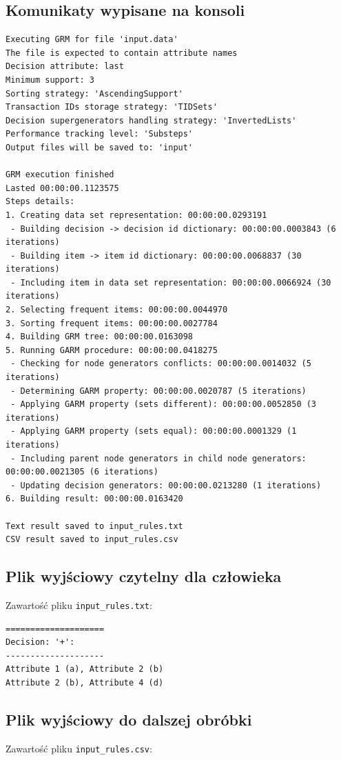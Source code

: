\documentclass[a4paper,10pt]{article}
\begin{document}
 \subsection{Komunikaty wypisane na konsoli}

\begin{verbatim}
Executing GRM for file 'input.data'
The file is expected to contain attribute names
Decision attribute: last
Minimum support: 3
Sorting strategy: 'AscendingSupport'
Transaction IDs storage strategy: 'TIDSets'
Decision supergenerators handling strategy: 'InvertedLists'
Performance tracking level: 'Substeps'
Output files will be saved to: 'input'

GRM execution finished
Lasted 00:00:00.1123575
Steps details:
1. Creating data set representation: 00:00:00.0293191
 - Building decision -> decision id dictionary: 00:00:00.0003843 (6 iterations)
 - Building item -> item id dictionary: 00:00:00.0068837 (30 iterations)
 - Including item in data set representation: 00:00:00.0066924 (30 iterations)
2. Selecting frequent items: 00:00:00.0044970
3. Sorting frequent items: 00:00:00.0027784
4. Building GRM tree: 00:00:00.0163098
5. Running GARM procedure: 00:00:00.0418275
 - Checking for node generators conflicts: 00:00:00.0014032 (5 iterations)
 - Determining GARM property: 00:00:00.0020787 (5 iterations)
 - Applying GARM property (sets different): 00:00:00.0052850 (3 iterations)
 - Applying GARM property (sets equal): 00:00:00.0001329 (1 iterations)
 - Including parent node generators in child node generators: 00:00:00.0021305 (6 iterations)
 - Updating decision generators: 00:00:00.0213280 (1 iterations)
6. Building result: 00:00:00.0163420

Text result saved to input_rules.txt
CSV result saved to input_rules.csv
\end{verbatim}


 \subsection{Plik wyjściowy czytelny dla człowieka}
 Zawartość pliku \verb+input_rules.txt+:

\begin{verbatim}
====================
Decision: '+':
--------------------
Attribute 1 (a), Attribute 2 (b)
Attribute 2 (b), Attribute 4 (d)
\end{verbatim}


 \subsection{Plik wyjściowy do dalszej obróbki}
 Zawartość pliku \verb+input_rules.csv+:
\end{document}
